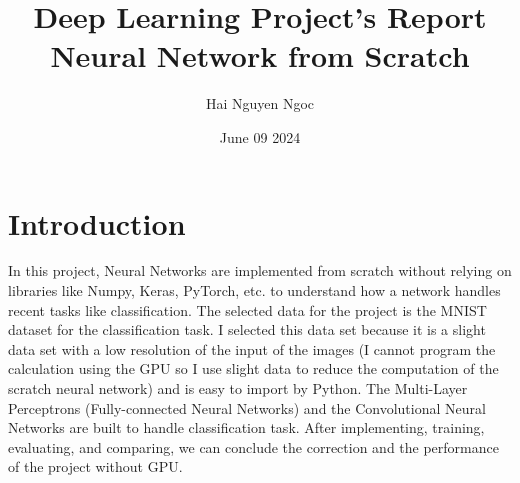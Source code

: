 \documentclass{article}
\title{Deep Learning Project's Report \\
Neural Network from Scratch}
\author{Hai Nguyen Ngoc}
\date{June 09 2024}
\begin{document}
\maketitle

\section{Introduction}
    In this project, Neural Networks are implemented from scratch without relying on libraries like Numpy, Keras, PyTorch, etc. to understand how a network handles recent tasks like classification. The selected data for the project is the MNIST dataset for the classification task. I selected this data set because it is a slight data set with a low resolution of the input of the images (I cannot program the calculation using the GPU so I use slight data to reduce the computation of the scratch neural network) and is easy to import by Python. The Multi-Layer Perceptrons (Fully-connected Neural Networks) and the Convolutional Neural Networks are built to handle classification task. After implementing, training, evaluating, and comparing, we can conclude the correction and the performance of the project without GPU.
\end{document}
